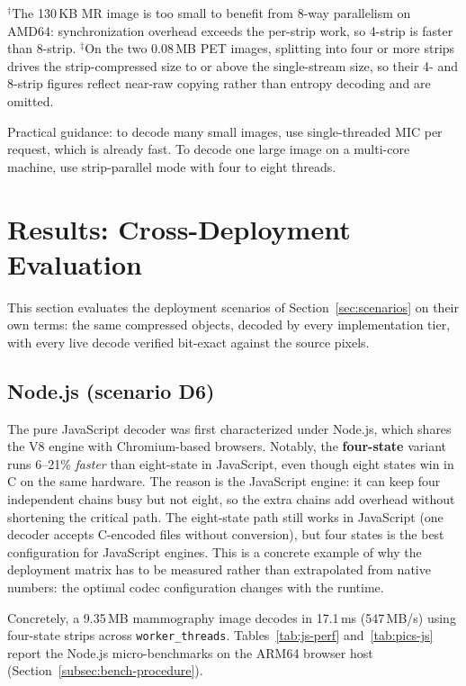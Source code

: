 \documentclass[journal]{IEEEtran}
\begin{document}
\begin{table}[htbp]
\vspace{2pt}
{\scriptsize $^\dagger$The 130\,KB MR image is too small to benefit from
8-way parallelism on AMD64: synchronization overhead exceeds the per-strip
work, so 4-strip is faster than 8-strip. $^\ddagger$On the two 0.08\,MB PET
images, splitting into four or more strips drives the strip-compressed size
to or above the single-stream size, so their 4- and 8-strip figures reflect
near-raw copying rather than entropy decoding and are omitted.}
\end{table}

Practical guidance: to decode many small images, use single-threaded MIC
per request, which is already fast. To decode one large image on a
multi-core machine, use strip-parallel mode with four to eight threads.

\section{Results: Cross-Deployment Evaluation}
\label{sec:browser-matrix}

This section evaluates the deployment scenarios of
Section~\ref{sec:scenarios} on their own terms: the same compressed objects,
decoded by every implementation tier, with every live decode verified
bit-exact against the source pixels.

\subsection{Node.js (scenario D6)}
\label{sec:browser-results}

The pure JavaScript decoder was first characterized under Node.js, which
shares the V8 engine with Chromium-based browsers. Notably, the
\textbf{four-state} variant runs 6--21\% \emph{faster} than eight-state in
JavaScript, even though eight states win in C on the same hardware. The
reason is the JavaScript engine: it can keep four independent chains busy but
not eight, so the extra chains add overhead without shortening the critical
path. The eight-state path still works in JavaScript (one decoder accepts
C-encoded files without conversion), but four states is the best
configuration for JavaScript engines. This is a concrete example of why the
deployment matrix has to be measured rather than extrapolated from native
numbers: the optimal codec configuration changes with the runtime.

Concretely, a 9.35\,MB mammography image decodes in 17.1\,ms (547\,MB/s)
using four-state strips across \texttt{worker\_threads}.
Tables~\ref{tab:js-perf} and~\ref{tab:pics-js} report the Node.js
micro-benchmarks on the ARM64 browser host
(Section~\ref{subsec:bench-procedure}).
\end{document}
